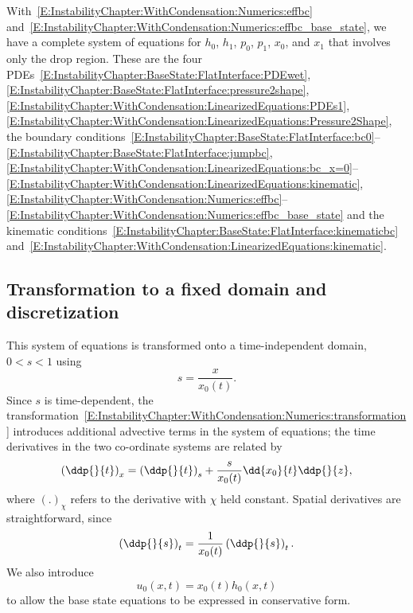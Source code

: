 \begin{subappendices}
With~\eqref{E:InstabilityChapter:WithCondensation:Numerics:effbc} and~\eqref{E:InstabilityChapter:WithCondensation:Numerics:effbc_base_state}, we have a complete system of equations for $h_0$, $h_1$,  $p_0$, $p_1$, $x_0$, and $x_1$ that involves only the drop region. These are the four PDEs~\eqref{E:InstabilityChapter:BaseState:FlatInterface:PDEwet}, \eqref{E:InstabilityChapter:BaseState:FlatInterface:pressure2shape}, \eqref{E:InstabilityChapter:WithCondensation:LinearizedEquations:PDEs1}, \eqref{E:InstabilityChapter:WithCondensation:LinearizedEquations:Pressure2Shape}, the boundary conditions~\eqref{E:InstabilityChapter:BaseState:FlatInterface:bc0}--\eqref{E:InstabilityChapter:BaseState:FlatInterface:jumpbc},
\eqref{E:InstabilityChapter:WithCondensation:LinearizedEquations:bc_x=0}--\eqref{E:InstabilityChapter:WithCondensation:LinearizedEquations:kinematic}, \eqref{E:InstabilityChapter:WithCondensation:Numerics:effbc}--\eqref{E:InstabilityChapter:WithCondensation:Numerics:effbc_base_state} and the kinematic conditions~\eqref{E:InstabilityChapter:BaseState:FlatInterface:kinematicbc} and~\eqref{E:InstabilityChapter:WithCondensation:LinearizedEquations:kinematic}.
\subsection{Transformation to a fixed domain and discretization}
This system of equations is transformed onto a time-independent domain, $0 < s < 1$ using
\begin{equation}\label{E:InstabilityChapter:WithCondensation:Numerics:transformation}
s = \frac{x}{x_0(t)}.
\end{equation}
Since $s$ is time-dependent, the transformation~\eqref{E:InstabilityChapter:WithCondensation:Numerics:transformation} introduces additional advective terms in the system of equations; the time derivatives in the two co-ordinate systems are related by
\begin{equation}\label{E:InstabilityChapter:WithCondensation:Numerics:transformation_space_derivative}
\left(\ddp{}{t}\right)_{x} =\left(\ddp{}{t}\right)_{s} +\frac{s}{x_0(t)}\dd{x_0}{t} \ddp{}{z},
\end{equation}
where $\left(.\right)_{\chi}$ refers to the derivative with  $\chi$ held constant. Spatial derivatives are straightforward, since
\begin{equation}\label{E:InstabilityChapter:WithCondensation:Numerics:transformation_time_derivatives}
\left(\ddp{}{s} \right)_t= \frac{1}{x_0(t)}\left(\ddp{}{s}\right)_t.
\end{equation}
We also introduce
\begin{equation}\label{E:InstabilityChapter:WithCondensation:Numerics:transformation_base_state_shape}
u_0(x,t) = x_0(t)h_0(x,t)
\end{equation}
to allow the base state equations to be expressed in conservative form.


\end{subappendices}
